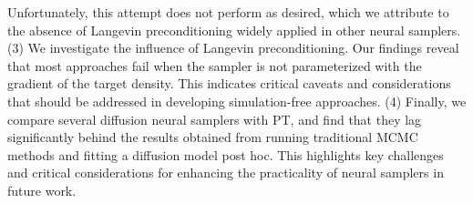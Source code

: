     Unfortunately, this attempt does not perform as desired, which we attribute to the absence of Langevin preconditioning widely applied in other neural samplers.
(3)  We investigate the influence of Langevin preconditioning. 
    Our findings reveal that most approaches fail when the sampler is not parameterized with the gradient of the target density. 
    This indicates critical caveats and considerations that should be addressed in developing simulation-free approaches.
(4) Finally, we compare several diffusion neural samplers with PT, and find that they lag significantly behind the results obtained from running traditional MCMC methods and fitting a diffusion model post hoc. 
    This highlights key challenges and critical considerations for enhancing the practicality of neural samplers in future work.

\par

